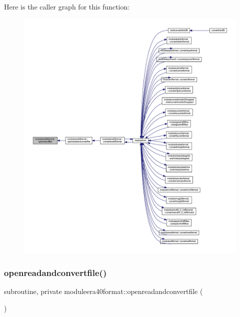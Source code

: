 Here is the caller graph for this function\+:\nopagebreak
\begin{figure}[H]
\begin{center}
\leavevmode
\includegraphics[width=350pt]{namespacemoduleera40format_a462785fbcd7874f4f3ab321366b79ec9_icgraph}
\end{center}
\end{figure}
\mbox{\label{namespacemoduleera40format_ab03a5122cb83fd0b3153870ed6bf1cdc}} 
\subsubsection{\texorpdfstring{openreadandconvertfile()}{openreadandconvertfile()}}
{\footnotesize\ttfamily subroutine, private moduleera40format\+::openreadandconvertfile (\begin{DoxyParamCaption}{ }\end{DoxyParamCaption})\hspace{0.3cm}{\ttfamily [private]}}

